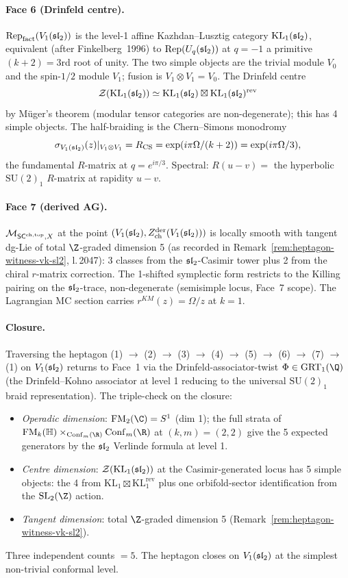 \paragraph{Face 6 (Drinfeld centre).} $\mathrm{Rep}_{\mathrm{fact}}(V_1(\mathfrak{sl}_2))$ is the level-1 affine Kazhdan--Lusztig category $\mathrm{KL}_1(\mathfrak{sl}_2)$, equivalent (after Finkelberg~1996) to $\mathrm{Rep}(U_q(\mathfrak{sl}_2))$ at $q = -1$ a primitive $(k + 2) = 3$rd root of unity. The two simple objects are the trivial module $V_0$ and the spin-$1/2$ module $V_1$; fusion is $V_1 \otimes V_1 = V_0$. The Drinfeld centre
\[
\mathcal{Z}(\mathrm{KL}_1(\mathfrak{sl}_2)) \simeq \mathrm{KL}_1(\mathfrak{sl}_2) \boxtimes \mathrm{KL}_1(\mathfrak{sl}_2)^{\mathrm{rev}}
\]
by Müger's theorem (modular tensor categories are non-degenerate); this has 4 simple objects. The half-braiding is the Chern--Simons monodromy
\[
\sigma_{V_1(\mathfrak{sl}_2)}(z)|_{V_1 \otimes V_1} = R_{\mathrm{CS}} = \exp(i\pi \Omega / (k + 2)) = \exp(i\pi \Omega / 3),
\]
the fundamental $R$-matrix at $q = e^{i\pi/3}$. Spectral: $R(u - v) = $ the hyperbolic $\mathrm{SU}(2)_1$ $R$-matrix at rapidity $u - v$.

\paragraph{Face 7 (derived AG).} $\mathcal{M}_{\mathsf{SC}^{\mathrm{ch},\mathrm{top}}, X}$ at the point $(V_1(\mathfrak{sl}_2), Z^{\mathrm{der}}_{\mathrm{ch}}(V_1(\mathfrak{sl}_2)))$ is locally smooth with tangent dg-Lie of total $\Z$-graded dimension 5 (as recorded in Remark~\ref*{rem:heptagon-witness-vk-sl2}, l.\,2047): 3 classes from the $\mathfrak{sl}_2$-Casimir tower plus 2 from the chiral $r$-matrix correction. The 1-shifted symplectic form restricts to the Killing pairing on the $\mathfrak{sl}_2$-trace, non-degenerate (semisimple locus, Face~7 scope). The Lagrangian MC section carries $r^{KM}(z) = \Omega/z$ at $k = 1$.

\paragraph{Closure.} Traversing the heptagon (1) $\to$ (2) $\to$ (3) $\to$ (4) $\to$ (5) $\to$ (6) $\to$ (7) $\to$ (1) on $V_1(\mathfrak{sl}_2)$ returns to Face~1 via the Drinfeld-associator-twist $\Phi \in \mathrm{GRT}_1(\Q)$ (the Drinfeld--Kohno associator at level 1 reducing to the universal $\mathrm{SU}(2)_1$ braid representation). The triple-check on the closure:
\begin{itemize}
\item \emph{Operadic dimension}: $\FM_2(\C) = S^1$ (dim 1); the full strata of $\FM_k(\mathbb H) \times_{\Conf_m(\R)} \Conf_m(\R)$ at $(k, m) = (2, 2)$ give the 5 expected generators by the $\mathfrak{sl}_2$ Verlinde formula at level 1.
\item \emph{Centre dimension}: $\mathcal{Z}(\mathrm{KL}_1(\mathfrak{sl}_2))$ at the Casimir-generated locus has 5 simple objects: the 4 from $\mathrm{KL}_1 \boxtimes \mathrm{KL}_1^{\mathrm{rev}}$ plus one orbifold-sector identification from the $\mathrm{SL}_2(\Z)$ action.
\item \emph{Tangent dimension}: total $\Z$-graded dimension 5 (Remark~\ref*{rem:heptagon-witness-vk-sl2}).
\end{itemize}
Three independent counts $= 5$. The heptagon closes on $V_1(\mathfrak{sl}_2)$ at the simplest non-trivial conformal level.

